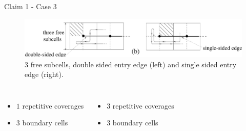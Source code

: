 \documentclass{beamer}
\begin{document}
\begin{frame}{Claim 1 - Case 3}
    \begin{figure}
        \includegraphics[width=\linewidth]{Images/inv_10_mid.png}
        \caption{3 free subcells, double sided entry edge (left) and single sided entry edge (right).}
    \end{figure}
    \begin{columns}
        \begin{itemize}
            \item $1$ repetitive coverages
            \item $3$ boundary cells
        \end{itemize}

        \begin{itemize}
            \item $3$ repetitive coverages
            \item $3$ boundary cells
        \end{itemize}
    \end{columns}
\end{frame}
\end{document}
